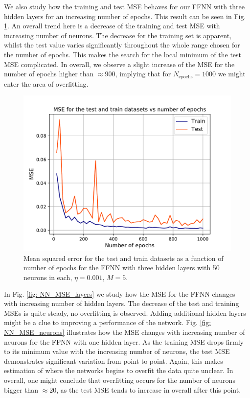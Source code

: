 \documentclass{emulateapj}
\begin{document}
We also study how the training and test MSE behaves for our FFNN with three hidden layers for an increasing number of epochs. This result can be seen in Fig. \ref{fig: NN_MSE_epochs}. An overall trend here is a decrease of the training and test MSE with increasing number of neurons. The decrease for the training set is apparent, whilst the test value varies significantly throughout the whole range chosen for the number of epochs. This makes the search for the local minimum of the test MSE complicated. In overall, we observe a slight increase of the MSE for the number of epochs higher than $\approx 900$, implying that for  $N_{\mathrm{epochs}}=1000$ we might enter the area of overfitting.

\begin{figure}[!htb]
    \centering
    \includegraphics[width=.49\textwidth]{Figures/NN_MSE_epochs.pdf}
    \caption{Mean squared error for the test and train datasets as a function of number of epochs for the FFNN with three hidden layers with 50 neurons in each, $\eta=0.001$, $M=5$.}
    \label{fig: NN_MSE_epochs}
\end{figure}

In Fig. \ref{fig: NN_MSE_layers} we study how the MSE for the FFNN changes with increasing number of hidden layers. The decrease of the test and training MSEs is quite steady, no overfitting is observed. Adding additional hidden layers might be a clue to improving a performance of the network. Fig. \ref{fig: NN_MSE_neurons} illustrates how the MSE changes with increasing number of neurons for the FFNN with one hidden layer. As the training MSE drops firmly to its minimum value with the increasing number of neurons, the test MSE demonstrates significant variation from point to point. Again, this makes estimation of where the networks begins to overfit the data quite unclear. In overall, one might conclude that overfitting occurs for the number of neurons bigger than $\approx20$, as the test MSE tends to increase in overall after this point. 
\end{document}
